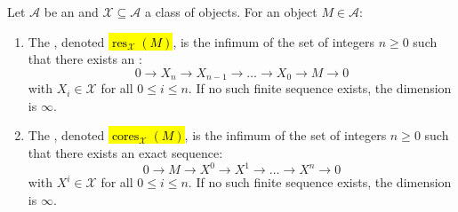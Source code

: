 \begin{definition} \label{definition:left_right_dimension_of_an_object_in_an_abelian_category_with_respect_to_resolutions_in_a_class_of_objects}
Let $\mathcal{A}$ be an  and $\mathcal{X} \subseteq \mathcal{A}$ a class of objects. For an object $M \in \mathcal{A}$:
\begin{enumerate}
    \item The , denoted \hl{$\operatorname{res}_{\mathcal{X}}(M)$}, is the infimum of the set of integers $n \geq 0$ such that there exists an :
    $$0 \to X_n \to X_{n-1} \to \dots \to X_0 \to M \to 0$$
    with $X_i \in \mathcal{X}$ for all $0 \leq i \leq n$. If no such finite sequence exists, the dimension is $\infty$.
    \item The , denoted \hl{$\operatorname{cores}_{\mathcal{X}}(M)$}, is the infimum of the set of integers $n \geq 0$ such that there exists an exact sequence:
    $$0 \to M \to X^0 \to X^1 \to \dots \to X^n \to 0$$
    with $X^i \in \mathcal{X}$ for all $0 \leq i \leq n$. If no such finite sequence exists, the dimension is $\infty$.
\end{enumerate}
\end{definition}